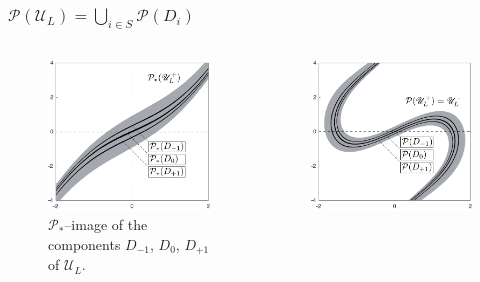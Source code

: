 \documentclass [10pt] {beamer}
\begin{document}
\begin{frame}
	\frametitle{$\mathcal{P}(\mathscr{U}_L) = \bigcup_{i \in S} \mathcal{P}(D_i)$}
	\begin{columns}[T]
		\begin{column}{.5\textwidth}
			\begin{figure}
			\includegraphics[width = 1\textwidth]{pic/h-strips-step-4.pdf}
			\caption{$\mathcal{P}_*$--image of the components $D_{-1}$, $D_0$, $D_{+1}$ of $\mathscr{U}_L$.}
			\label{pic:h-strips-step-4}
			\end{figure}
		\end{column}
		\begin{column}{.5\textwidth}
			\begin{figure}
			\includegraphics[width = 1\textwidth]{pic/h-strips-step-5.pdf}

\end{figure}
\end{column}
\end{columns}
\end{frame}
\end{document}
